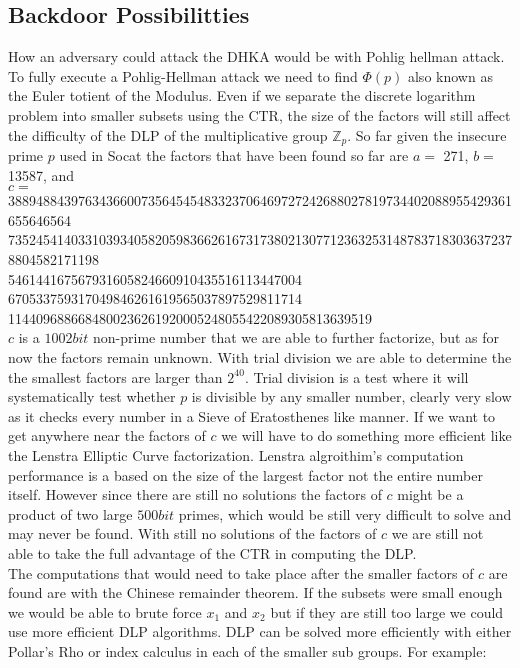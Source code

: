 \documentclass[letterpaper,11pt,notitlepage,fleqn]{article}
\begin{document}
\subsection{Backdoor Possibilitties}
\noindent How an adversary could attack the DHKA would be with Pohlig hellman attack.\\
\indent To fully execute a Pohlig-Hellman attack we need to find $\Phi(p)$ also known as the Euler totient of the Modulus. Even if we separate the discrete logarithm problem into smaller subsets using the CTR, the size of the factors will still affect the difficulty of the DLP of the multiplicative group $\mathbb{Z}_{p}$. So far given the insecure prime $p$ used in Socat the factors that have been found so far are $a =$ 271, $b =$ 13587, and 
\\$c =$
388948843976343660073564545483323706469727242688027819734402088955429361655646564 \\
7352454140331039340582059836626167317380213077123632531487837183036372378804582171198 \\
546144167567931605824660910435516113447004 670533759317049846261619565037897529811714 \\
1144096886684800236261920005248055422089305813639519 \\ 
$c$ is a $1002 bit$ non-prime number that we are able to further factorize, but as for now the factors remain unknown. With trial division we are able to determine the the smallest factors are larger than $2^40$. Trial division is a test where it will systematically test whether $p$ is divisible by any smaller number, clearly very slow as it checks every number in a Sieve of Eratosthenes like manner. If we want to get anywhere near the factors of $c$ we will have to do something more efficient
like the Lenstra Elliptic Curve factorization. Lenstra algroithim's computation performance is a based on the size of the largest factor not the entire number itself.  However since there are still no solutions the factors of $c$ might be a product of two large $500 bit$ primes, which would be still very difficult to solve and may never be found. With still no solutions of the factors of $c$ we are still not able to take the full advantage of the CTR in computing the DLP. 
\\
The computations that would need to take place after the smaller factors of $c$ are found are with the Chinese remainder theorem. If the subsets were small enough we would be able to brute force $x_{1}$ and $x_{2}$ but if they are still too large we could use more efficient DLP algorithms. DLP can be solved more efficiently with either Pollar's Rho or index calculus in each of the smaller sub groups. For example:\\
\end{document}
